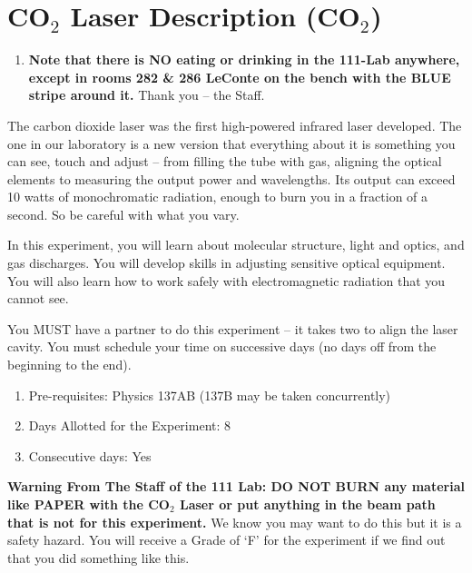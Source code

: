 \documentclass{../lab}
\begin{document}
\maketitle

\tableofcontents

\section{CO\texorpdfstring{$_2$}{2} Laser Description (CO\texorpdfstring{$_2$}{2})}

\begin{enumerate}
    \item \textbf{Note that there is NO eating or drinking in the 111-Lab anywhere, except in rooms 282 \& 286 LeConte on the bench with the BLUE stripe around it.} Thank you -- the Staff.

\end{enumerate}

The carbon dioxide laser was the first high-powered infrared laser developed. The one in our laboratory is a new version that everything about it is something you can see, touch and adjust -- from filling the tube with gas, aligning the optical elements to measuring the output power and wavelengths. Its output can exceed 10 watts of monochromatic radiation, enough to burn you in a fraction of a second. So be careful with what you vary. 

In this experiment, you will learn about molecular structure, light and optics, and gas discharges. You will develop skills in adjusting sensitive optical equipment. You will also learn how to work safely with electromagnetic radiation that you cannot see.

You MUST have a partner to do this experiment -- it takes two to align the laser cavity. You must schedule your time on successive days (no days off from the beginning to the end).

\begin{enumerate}
    \item Pre-requisites: Physics 137AB (137B may be taken concurrently)

    \item Days Allotted for the Experiment: 8

    \item Consecutive days: Yes

\end{enumerate}

\textbf{Warning From The Staff of the 111 Lab: DO NOT BURN any material like PAPER with the CO$_2$ Laser or put anything in the beam path that is not for this experiment.} We know you may want to do this but it is a safety hazard. You will receive a Grade of `F' for the experiment if we find out that you did something like this.
\end{document}
